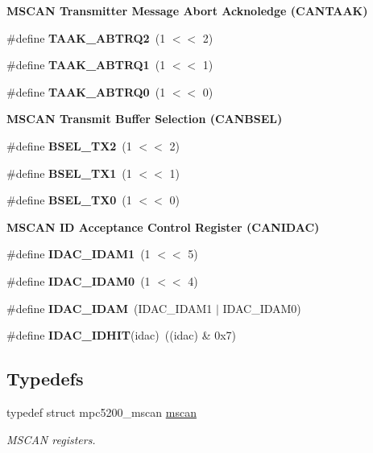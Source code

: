 \begin{Indent}\textbf{ M\+S\+C\+AN Transmitter Message Abort Acknoledge (C\+A\+N\+T\+A\+AK)}\par
\begin{DoxyCompactItemize}
\item 
\#define {\bfseries T\+A\+A\+K\+\_\+\+A\+B\+T\+R\+Q2}~(1 $<$$<$ 2)
\item 
\#define {\bfseries T\+A\+A\+K\+\_\+\+A\+B\+T\+R\+Q1}~(1 $<$$<$ 1)
\item 
\#define {\bfseries T\+A\+A\+K\+\_\+\+A\+B\+T\+R\+Q0}~(1 $<$$<$ 0)
\end{DoxyCompactItemize}
\end{Indent}
\begin{Indent}\textbf{ M\+S\+C\+AN Transmit Buffer Selection (C\+A\+N\+B\+S\+EL)}\par
\begin{DoxyCompactItemize}
\item 
\#define {\bfseries B\+S\+E\+L\+\_\+\+T\+X2}~(1 $<$$<$ 2)
\item 
\#define {\bfseries B\+S\+E\+L\+\_\+\+T\+X1}~(1 $<$$<$ 1)
\item 
\#define {\bfseries B\+S\+E\+L\+\_\+\+T\+X0}~(1 $<$$<$ 0)
\end{DoxyCompactItemize}
\end{Indent}
\begin{Indent}\textbf{ M\+S\+C\+AN ID Acceptance Control Register (C\+A\+N\+I\+D\+AC)}\par
\begin{DoxyCompactItemize}
\item 
\#define {\bfseries I\+D\+A\+C\+\_\+\+I\+D\+A\+M1}~(1 $<$$<$ 5)
\item 
\#define {\bfseries I\+D\+A\+C\+\_\+\+I\+D\+A\+M0}~(1 $<$$<$ 4)
\item 
\#define {\bfseries I\+D\+A\+C\+\_\+\+I\+D\+AM}~(I\+D\+A\+C\+\_\+\+I\+D\+A\+M1 $\vert$ I\+D\+A\+C\+\_\+\+I\+D\+A\+M0)
\item 
\#define {\bfseries I\+D\+A\+C\+\_\+\+I\+D\+H\+IT}(idac)~((idac) \& 0x7)
\end{DoxyCompactItemize}
\end{Indent}
\subsection*{Typedefs}
\begin{DoxyCompactItemize}
\item 
typedef struct mpc5200\+\_\+mscan \mbox{\hyperlink{group__RTEMSBSPsPowerPCGen5200MSCAN_gacfd56a4a482c5e7da2cff003284b2d51}{mscan}}
\begin{DoxyCompactList}\small\item\em M\+S\+C\+AN registers. \end{DoxyCompactList}\end{DoxyCompactItemize}
